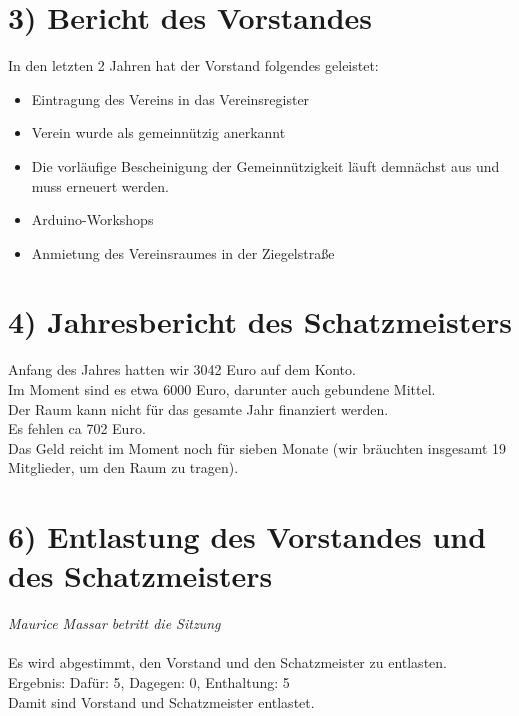 \documentclass{scrartcl}
\begin{document}
\section*{3) Bericht des Vorstandes}
    In den letzten 2 Jahren hat der Vorstand folgendes geleistet:

    \begin{itemize}
    \item Eintragung des Vereins in das Vereinsregister
    \item Verein wurde als gemeinnützig anerkannt
    \item Die vorläufige Bescheinigung der Gemeinnützigkeit läuft demnächst aus und muss erneuert werden.
    \item Arduino-Workshops
    \item Anmietung des Vereinsraumes in der Ziegelstraße
    \end{itemize}

\section*{4) Jahresbericht des Schatzmeisters}

Anfang des Jahres hatten wir 3042 Euro auf dem Konto.\\
Im Moment sind es etwa 6000 Euro, darunter auch gebundene Mittel.\\
Der Raum kann nicht für das gesamte Jahr finanziert werden.\\
Es fehlen ca 702 Euro.\\
Das Geld reicht im Moment noch für sieben Monate (wir bräuchten insgesamt 19 Mitglieder, um den Raum zu tragen).

\section*{6) Entlastung des Vorstandes und des Schatzmeisters}
\emph{Maurice Massar betritt die Sitzung}\\
\\
Es wird abgestimmt, den Vorstand und den Schatzmeister zu entlasten. \\
Ergebnis: Dafür: 5, Dagegen: 0, Enthaltung: 5\\
Damit sind Vorstand und Schatzmeister entlastet.
\end{document}
